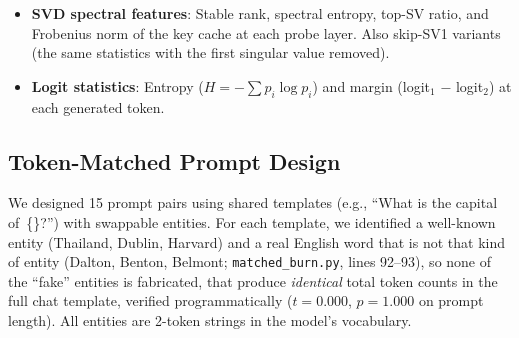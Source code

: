 \documentclass[11pt,a4paper]{article}
\begin{document}
\begin{itemize}[nosep]
    \item \textbf{SVD spectral features}: Stable rank, spectral entropy,
          top-SV ratio, and Frobenius norm of the key cache at each probe
          layer. Also skip-SV1 variants (the same statistics with the first singular value removed).
    \item \textbf{Logit statistics}: Entropy ($H = -\sum p_i \log p_i$)
          and margin (logit$_1$ $-$ logit$_2$) at each generated token.
\end{itemize}

\subsection{Token-Matched Prompt Design}
\label{sec:prompts}

We designed 15 prompt pairs using shared templates (e.g., ``What is the
capital of~\{\}?'') with swappable entities. For each template, we
identified a well-known entity (Thailand, Dublin, Harvard) and a
real English word that is not that kind of entity (Dalton, Benton,
Belmont; \texttt{matched\_burn.py}, lines 92--93), so none of the ``fake''
entities is fabricated, that produce
\emph{identical} total token counts in the full chat template, verified
programmatically ($t{=}0.000$, $p{=}1.000$ on prompt length). All
entities are 2-token strings in the model's vocabulary.
\end{document}
